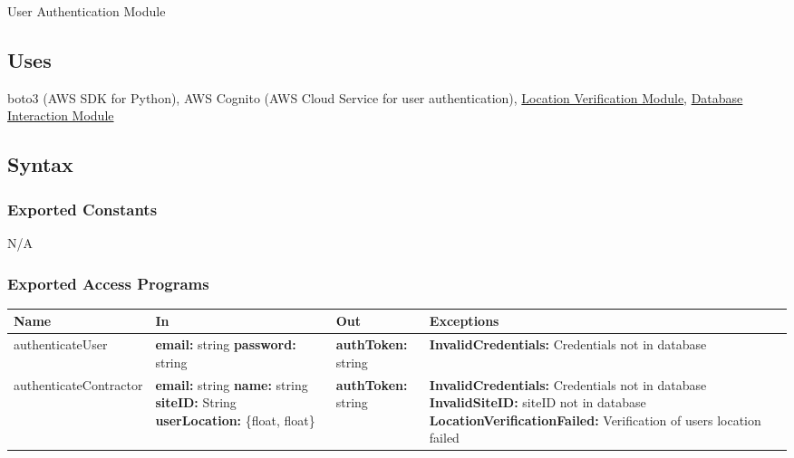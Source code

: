 \documentclass[12pt, titlepage]{article}
\begin{document}
{  User Authentication Module

  \subsection{Uses}

  boto3 (AWS SDK for Python), AWS Cognito (AWS Cloud Service for user
  authentication), \hyperref[sec:LV]{Location Verification Module},
  \hyperref[sec:DI]{Database Interaction Module}

  \subsection{Syntax}

  \subsubsection{Exported Constants}

  N/A

  \subsubsection{Exported Access Programs}

  \begin{center}
    \begin{tabular}{>{\raggedright}p{4cm} >{\raggedright}p{3cm}
      >{\raggedright}p{4cm} p{4cm}}
      \hline
      \textbf{Name} & \textbf{In} & \textbf{Out} & \textbf{Exceptions} \\
      \hline
      authenticateUser & \textbf{email:} string \newline
      \textbf{password:} string & \textbf{authToken:} string &
      \textbf{InvalidCredentials:} Credentials not in database \\
      \hline
      authenticateContractor & \textbf{email:} string \newline
      \textbf{name:} string \newline \textbf{siteID:} String \newline
      \textbf{userLocation:} \{float, float\} &
      \textbf{authToken:} string & \textbf{InvalidCredentials:}
      Credentials not in database \newline
      \textbf{InvalidSiteID:}
      siteID not in database \newline
      \textbf{LocationVerificationFailed:} Verification of users
      location failed \\
      \hline
    \end{tabular}
  \end{center}

}
\end{document}
